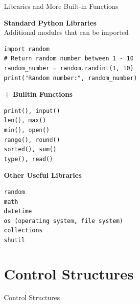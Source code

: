 \documentclass[
	11pt, 
]{beamer}
\begin{document}

\begin{frame}[fragile]{Libraries and More Built-in Functions}
       \small %
    \begin{minipage}[t]{0.7\textwidth} %
    \textbf{Standard Python Libraries}\\
    Additional modules that can be imported
    \begin{verbatim}
import random
# Return random number between 1 - 10
random_number = random.randint(1, 10)
print("Random number:", random_number)
    \end{verbatim}
\end{minipage}
\hfill %
\begin{minipage}[t]{0.29\textwidth} %
    \textbf{+ Builtin Functions}
    \begin{verbatim}
print(), input()
len(), max()
min(), open()
range(), round()
sorted(), sum()
type(), read()
    \end{verbatim}
\end{minipage}

    \vspace{1em} %

    \begin{minipage}[t]{0.45\textwidth}
    \textbf{Other Useful Libraries}
        \begin{verbatim}
random
math
datetime
os (operating system, file system)
collections
shutil
        \end{verbatim}
    \end{minipage}

\end{frame}





\section{Control Structures}
\begin{frame}{Control Structures}
\end{frame}


\end{document}
